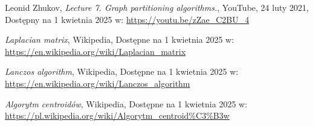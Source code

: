 \documentclass{article}
\begin{document}
\begin{thebibliography}{9}

Leonid Zhukov, \textit{Lecture 7. Graph partitioning algorithms.}, YouTube, 24 luty 2021, Dostępny na 1 kwietnia 2025 w: \url{https://youtu.be/zZae_C2BU_4}

\textit{Laplacian matrix}, Wikipedia, Dostępne na 1 kwietnia 2025 w: \url{https://en.wikipedia.org/wiki/Laplacian_matrix}

\textit{Lanczos algorithm}, Wikipedia, Dostępne na 1 kwietnia 2025 w:
\url{https://en.wikipedia.org/wiki/Lanczos_algorithm}

\textit{Algorytm centroidów}, Wikipedia, Dostępne na 1 kwietnia 2025 w:
\url{https://pl.wikipedia.org/wiki/Algorytm_centroid%C3%B3w}

\end{thebibliography}
\end{document}
